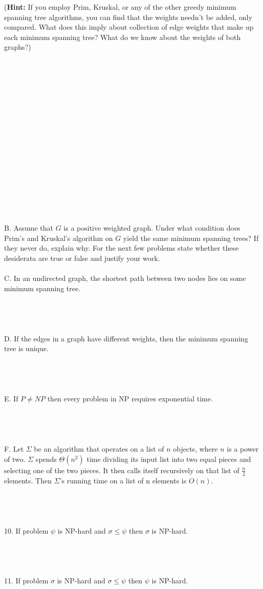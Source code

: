 \documentclass[12pt]{article}
\begin{document}
(\textbf{Hint: }If you employ Prim, Kruskal, or any of the other greedy minimum spanning tree algorithms, you can find that the weights needn't be added, only compared. 
What does this imply about collection of edge weights that make up each minimum spanning tree? What do we know about the weights of both graphs?)\\\\\\\\\\\\\\\\\\\\\\\\\\\\\\\\\\\\
\noindent B. Assume that $G$ is a positive weighted graph. 
Under what condition does Prim's and Kruskal's algorithm on $G$  
yield the same minimum spanning trees? If they never do, explain why.
\newpage
\noindent For the next few problems state whether these desiderata are true or false and justify your work.\\\\
C. In an undirected graph, the shortest path between two nodes lies on some minimum spanning
tree.\\\\\\\\\\
D. If the edges in a graph have different weights, then the minimum spanning tree is unique.\\\\\\\\\\
E. If $P \ne NP$ then every problem in NP requires exponential time.\\\\\\\\\\
F. Let $\Sigma$ be an algorithm that operates on a list of $n$ objects, 
where $n$ is a power of two. $\Sigma$ spends $\Theta(n^2)$ time dividing its input 
list into two equal pieces and selecting one of the two pieces. It 
then calls itself recursively on that list of $\frac{n}{2}$ elements. Then $\Sigma$'s 
running time on a list of n elements is $O(n)$.\\\\\\\\\\
10. If problem $\psi$ is NP-hard and $\sigma \le \psi$ then $\sigma$ is NP-hard.\\\\\\\\\\
11. If problem $\sigma$ is NP-hard and $\sigma \le \psi$ then $\psi$ is NP-hard.
\newpage
\end{document}
